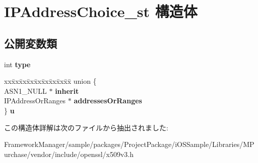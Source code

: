 \hypertarget{struct_i_p_address_choice__st}{}\section{I\+P\+Address\+Choice\+\_\+st 構造体}
\label{struct_i_p_address_choice__st}
\subsection*{公開変数類}
\begin{DoxyCompactItemize}
\item 
\hypertarget{struct_i_p_address_choice__st_a7682bd3a3f986e97124f6f3443a094a1}{}int {\bfseries type}\label{struct_i_p_address_choice__st_a7682bd3a3f986e97124f6f3443a094a1}

\item 
\hypertarget{struct_i_p_address_choice__st_a8cdd95aaeea40b8283f0eb296a4fafa1}{}\begin{tabbing}
xx\=xx\=xx\=xx\=xx\=xx\=xx\=xx\=xx\=\kill
union \{\\
\>ASN1\_NULL $\ast$ {\bfseries inherit}\\
\>IPAddressOrRanges $\ast$ {\bfseries addressesOrRanges}\\
\} {\bfseries u}\label{struct_i_p_address_choice__st_a8cdd95aaeea40b8283f0eb296a4fafa1}
\\

\end{tabbing}\end{DoxyCompactItemize}


この構造体詳解は次のファイルから抽出されました\+:\begin{DoxyCompactItemize}
\item 
Framework\+Manager/sample/packages/\+Project\+Package/i\+O\+S\+Sample/\+Libraries/\+M\+Purchase/vendor/include/openssl/x509v3.\+h\end{DoxyCompactItemize}

